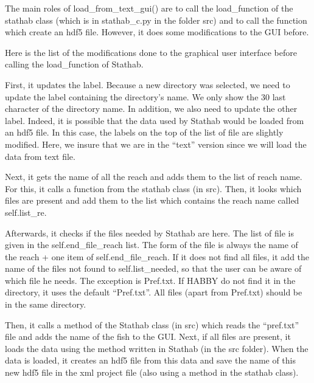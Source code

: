 \documentclass[letterpaper,10pt,english]{sphinxmanual}
\begin{document}
\begin{fulllineitems}
\begin{fulllineitems}
\end{fulllineitems}


\begin{fulllineitems}
\label{\detokenize{index:src_GUI.stathab_GUI.StathabW.load_from_txt_gui}}
The main roles of load\_from\_text\_gui() are to call the load\_function of the stathab class (which is in
stathab\_c.py in the folder src) and to call the function which create an hdf5 file. However, it does some
modifications to the GUI before.


Here is the list of the modifications done to the graphical user interface before calling the load\_function of
Stathab.

First, it updates the label. Because a new directory was selected, we need to update the label containing the
directory’s name. We only show the 30 last character of the directory name. In addition, we also need to update
the other label. Indeed, it is possible that the data used by Stathab would be loaded from an hdf5 file.
In this case, the labels on the top of the list of file are slightly modified. Here, we insure that we are in
the “text” version since we will load the data from text file.

Next, it gets the name of all the reach and adds them to the list of reach name. For this, it calls a function
from the stathab class (in src). Then, it looks which files are present and add them to the list which contains
the reach name called self.list\_re.

Afterwards, it checks if the files needed by Stathab are here. The list of file is given in the
self.end\_file\_reach list. The form of the file is always the name of the reach + one item of
self.end\_file\_reach. If it does not find all files, it add the name of the files not found to self.list\_needed,
so that the user can be aware of which file he needs. The exception is Pref.txt. If HABBY do not find it in the
directory, it uses the default “Pref.txt”. All files (apart from Pref.txt) should be in the same directory.

Then, it calls a method of the Stathab class (in src) which reads the “pref.txt” file and adds the name
of the fish to the GUI. Next, if all files are present, it loads the data using the method written in Stathab
(in the src folder). When the data is loaded, it creates an hdf5 file from this data and save the name of this
new hdf5 file in the xml project file (also using a method in the stathab class).


\end{fulllineitems}
\end{fulllineitems}
\end{document}
